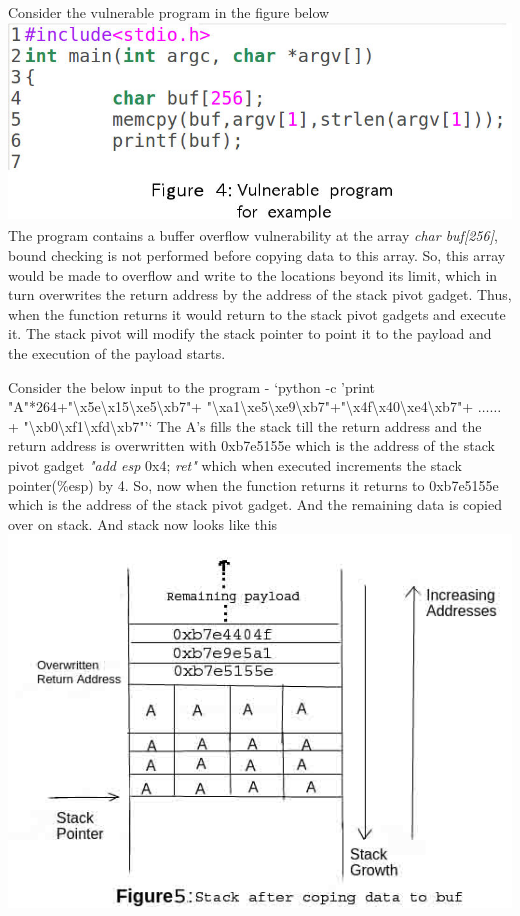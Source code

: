 \documentclass{article}
\begin{document}
\begin{multicols}{2}
	Consider the vulnerable program in the figure below
	\break \break
	\includegraphics[scale=.27]{vul_prog.jpg}\break \break
	The program contains a buffer overflow vulnerability at the array \textit{char buf[256]}, bound checking is not performed before copying data to this array. So, this array would be made to overflow and write to the locations beyond its limit, which in turn overwrites the return address by the address of the stack pivot gadget. Thus, when the function returns it would return to the stack pivot gadgets and execute it. The stack pivot will modify the stack pointer to point it to the payload and the execution of the payload starts.
	
	Consider the below input to the program - \break
	`python -c 'print "A"*264+"\textbackslash x5e\textbackslash x15\textbackslash xe5\textbackslash xb7"+ "\textbackslash xa1\textbackslash xe5\textbackslash xe9\textbackslash xb7"+"\textbackslash x4f\textbackslash x40\textbackslash xe4\textbackslash xb7"+ $\ldots\ldots$ + "\textbackslash xb0\textbackslash xf1\textbackslash xfd\textbackslash xb7"'` \break
	The A's fills the stack till the return address and the return address is overwritten with 0xb7e5155e which is the address of the stack pivot gadget \textit{"add esp} 0x4;\textit{ ret"} which when executed increments the stack pointer(\%esp) by 4. So, now when the function returns it returns to 0xb7e5155e which is the address of the stack pivot gadget. And the remaining data is copied over on stack. And stack now looks like this
	\includegraphics[scale=.4]{ex_prog.jpg}\break
		

\end{multicols}
\end{document}
